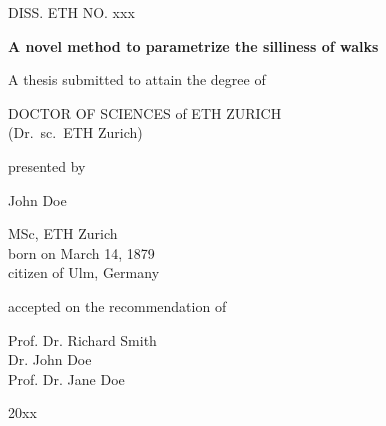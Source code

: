 \documentclass[pdftex, a4paper, oneside, 12pt, bibtotoc, idxtotoc ]{scrreprt}
\begin{document}

\begin{titlepage}
    \begin{center}
        DISS. ETH NO. xxx

        \vspace*{1.0cm}
        
        \Large
        \textbf{A novel method to parametrize the silliness of walks}

        \vspace*{1.0cm}
        
        \normalsize
        A thesis submitted to attain the degree of

        \vspace*{1.0cm}

        \Large
        DOCTOR OF SCIENCES of ETH ZURICH \\
        (Dr.\ sc.\ ETH Zurich)

        \vspace*{1.0cm}

        \normalsize
        presented by

        \vspace*{0.5cm}

        \Large
        John Doe

        \vspace*{0.5cm}
        
        \normalsize
        MSc, ETH Zurich \\
        born on March 14, 1879 \\
        citizen of Ulm, Germany

        \vspace{1.0cm}

        accepted on the recommendation of

        \vspace{0.5cm}

        Prof. Dr. Richard Smith \\
        Dr. John Doe \\
        Prof. Dr. Jane Doe 

        \vspace{0.5cm}

        20xx
        
    \end{center}
\end{titlepage}
\end{document}
